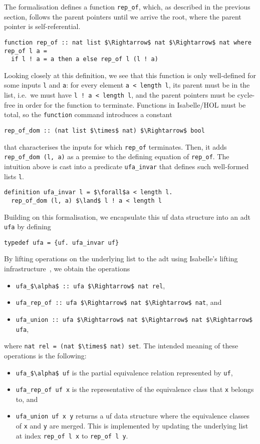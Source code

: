 \documentclass[
  sigplan,
  10pt,
  anonymous,
  review,
  ]{acmart}
\begin{document}
The formalisation defines a function \lstinline|rep_of|, which, as described in the previous section, follows the parent pointers until we arrive the root, where the parent pointer is self-referential.
\begin{lstlisting}[columns=fullflexible]
function rep_of :: nat list $\Rightarrow$ nat $\Rightarrow$ nat where
rep_of l a =
  if l ! a = a then a else rep_of l (l ! a)
\end{lstlisting}
Looking closely at this definition, we see that this function is only well-defined for some inputs \lstinline|l| and \lstinline|a|:
for every element \lstinline|a < length l|, its parent must be in the list, i.e.\ we must have \lstinline|l ! a < length l|, and the parent pointers must be cycle-free in order for the function to terminate.
Functions in Isabelle/HOL must be total, so the \lstinline|function| command introduces a constant
\begin{lstlisting}
rep_of_dom :: (nat list $\times$ nat) $\Rightarrow$ bool  
\end{lstlisting}
that characterises the inputs for which \lstinline|rep_of| terminates.
Then, it adds \lstinline|rep_of_dom (l, a)| as a premise to the defining equation of \lstinline|rep_of|. 
The intuition above is cast into a predicate \lstinline|ufa_invar| that defines such well-formed lists \lstinline|l|.
\begin{lstlisting}
definition ufa_invar l = $\forall$a < length l.
  rep_of_dom (l, a) $\land$ l ! a < length l
\end{lstlisting}
Building on this formalisation, we encapsulate this \acrshort{uf} data structure into an \acrfull{adt} \lstinline|ufa| by defining
\begin{lstlisting}
typedef ufa = {uf. ufa_invar uf}
\end{lstlisting}
By lifting operations on the underlying list to the \acrshort{adt} using Isabelle's lifting infrastructure~\cite{lifting_transfer}, we obtain the operations
\begin{itemize}
  \item \lstinline!ufa_$\alpha$ :: ufa $\Rightarrow$ nat rel!,
  \item \lstinline!ufa_rep_of :: ufa $\Rightarrow$ nat $\Rightarrow$ nat!, and
  \item \lstinline!ufa_union :: ufa $\Rightarrow$ nat $\Rightarrow$ nat $\Rightarrow$ ufa!,
\end{itemize}
where \lstinline!nat rel = (nat $\times$ nat) set!.
The intended meaning of these operations is the following:
\begin{itemize}
  \item \lstinline!ufa_$\alpha$ uf! is the partial equivalence relation represented by \lstinline!uf!,
  \item \lstinline!ufa_rep_of uf x! is the representative of the equivalence class that \lstinline!x! belongs to, and
  \item \lstinline!ufa_union uf x y! returns a \acrshort{uf} data structure where the equivalence classes of \lstinline!x! and \lstinline!y! are merged.
    This is implemented by updating the underlying list at index \lstinline!rep_of l x! to \lstinline|rep_of l y|.
\end{itemize}
\end{document}
